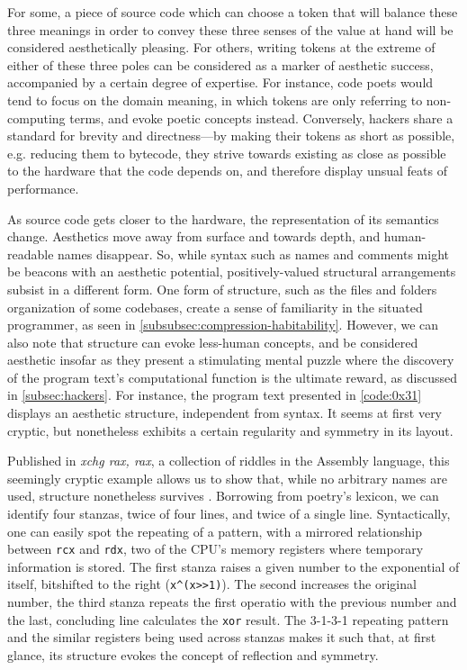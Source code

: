 For some, a piece of source code which can choose a token that will balance these three meanings in order to convey these three senses of the value at hand will be considered aesthetically pleasing. For others, writing tokens at the extreme of either of these three poles can be considered as a marker of aesthetic success, accompanied by a certain degree of expertise. For instance, code poets would tend to focus on the domain meaning, in which tokens are only referring to non-computing terms, and evoke poetic concepts instead. Conversely, hackers share a standard for brevity and directness—by making their tokens as short as possible, e.g. reducing them to bytecode, they strive towards existing as close as possible to the hardware that the code depends on, and therefore display unsual feats of performance.

As source code gets closer to the hardware, the representation of its semantics change. Aesthetics move away from surface and towards depth, and human-readable names disappear. So, while syntax such as names and comments might be beacons with an aesthetic potential, positively-valued structural arrangements subsist in a different form. One form of structure, such as the files and folders organization of some codebases, create a sense of familiarity in the situated programmer, as seen in \autoref{subsubsec:compression-habitability}. However, we can also note that structure can evoke less-human concepts, and  be considered aesthetic insofar as they present a stimulating mental puzzle where  the discovery of the program text's computational function is the ultimate reward, as discussed in \autoref{subsec:hackers}. For instance, the program text presented in \autoref{code:0x31} displays an aesthetic structure, independent from syntax. It seems at first very cryptic, but nonetheless exhibits a certain regularity and symmetry in its layout.

Published in \emph{xchg rax, rax}, a collection of riddles in the Assembly language, this seemingly cryptic example allows us to show that, while no arbitrary names are used, structure nonetheless survives \citep{xorpd_xchg_2014}. Borrowing from poetry's lexicon, we can identify four stanzas, twice of four lines, and twice of a single line. Syntactically, one can easily spot the repeating of a pattern, with a mirrored relationship between \lstinline{rcx} and \lstinline{rdx}, two of the CPU's memory registers where temporary information is stored. The first stanza raises a given number to the exponential of itself, bitshifted to the right (\lstinline{x^(x>>1)}). The second increases the original number, the third stanza repeats the first operatio with the previous number and the last, concluding line calculates the \lstinline{xor} result. The 3-1-3-1 repeating pattern and the similar registers being used across stanzas makes it such that, at first glance, its structure evokes the concept of reflection and symmetry.

